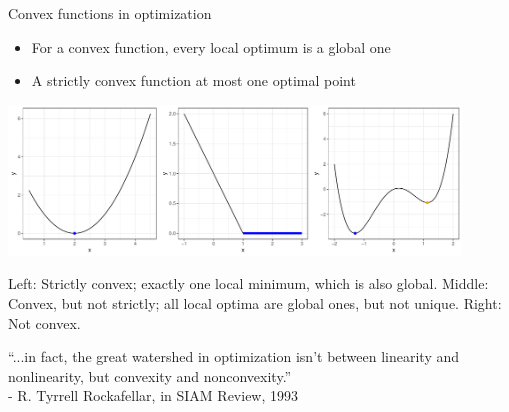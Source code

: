 \begin{vbframe}{Convex functions in optimization}
  

  \begin{itemize}
    \item For a convex function, every local optimum is a global one  
    \item A strictly convex function at most one optimal point
  \end{itemize}
  
  \begin{center}
  \includegraphics[width = 0.9\textwidth]{figure_man/convexity_3.pdf} \\
  \begin{footnotesize}
  Left: Strictly convex; exactly one local minimum, which is also global. Middle: Convex, but not strictly; all local optima are global ones, but not unique. Right: Not convex.
  \end{footnotesize} 
  \end{center}
  
\framebreak 

\vspace*{2cm}

\begin{center}
\Large{\enquote{...in fact, the great watershed in optimization isn't between linearity and nonlinearity, but convexity and nonconvexity.}}\\
\normalsize - R. Tyrrell Rockafellar, in SIAM Review, 1993
\end{center}

	
\end{vbframe}

\endlecture
